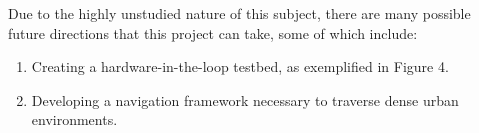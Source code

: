 Due to the highly unstudied nature of this subject, there are many possible future directions that this project can take, some of which include:

\begin{enumerate}
\item{Creating a hardware-in-the-loop testbed, as exemplified in Figure 4.}

\item{Developing a navigation framework necessary to traverse dense urban environments.}

\end{enumerate}
